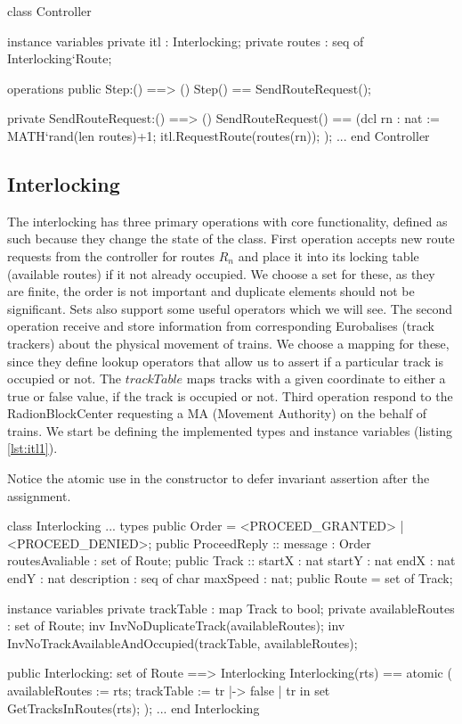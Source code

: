 \documentclass[preprint,12pt]{elsarticle}
\begin{document}
\begin{vdmsl}[label=lst:controller,caption=Definitions and SendRouteReques() operation in the Controller.]
	class Controller
	
	instance variables
	private itl : Interlocking;
	private routes : seq of Interlocking`Route;
	
	operations
	public Step:() ==> ()
	Step() == SendRouteRequest();
	
	private SendRouteRequest:() ==> ()
	SendRouteRequest() ==
	(dcl rn : nat := MATH`rand(len routes)+1;
		itl.RequestRoute(routes(rn));
	);
	...
	end Controller
\end{vdmsl}

\subsection{Interlocking}

The interlocking has three primary operations with core functionality, defined as such because they change the state of the class. First operation accepts new route requests from the controller for routes $R_{n}$ and place it into its locking table (available routes) if it not already occupied. We choose a set for these, as they are finite, the order is not important and duplicate elements should not be significant. Sets also support some useful operators which we will see. The second operation receive and store information from corresponding Eurobalises (track trackers) about the physical movement of trains. We choose a mapping for these, since they define lookup operators that allow us to assert if a particular track is occupied or not. The $trackTable$ maps tracks with a given coordinate to either a true or false value, if the track is occupied or not. Third operation respond to the RadionBlockCenter requesting a MA (Movement Authority) on the behalf of trains. We start be defining the implemented types and instance variables (listing \ref{lst:itl1}).

Notice the atomic use in the constructor to defer invariant assertion after the assignment.

\begin{vdmsl}[label=lst:itl1,caption=Types and state information and constructor for the Interlocking class.]
	class Interlocking
	...
	types
	public Order = <PROCEED_GRANTED> | <PROCEED_DENIED>;
	public ProceedReply :: message : Order
	routesAvaliable : set of Route;						 
	public Track :: startX : nat
	startY : nat
	endX : nat
	endY : nat
	description : seq of char
	maxSpeed : nat;
	public Route = set of Track;
	
	instance variables
	private trackTable : map Track to bool;
	private availableRoutes : set of Route;
	inv InvNoDuplicateTrack(availableRoutes);
	inv InvNoTrackAvailableAndOccupied(trackTable,
	 availableRoutes);
	
	public Interlocking: set of Route ==> Interlocking
	Interlocking(rts) ==
	atomic (
		availableRoutes := rts;
		trackTable := { tr |-> false |
			 tr in set GetTracksInRoutes(rts)};
	);
	...
	end Interlocking
\end{vdmsl}
\end{document}
